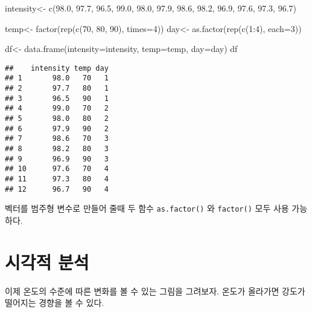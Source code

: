\documentclass[
]{book}
\newenvironment{Shaded}{\begin{snugshade}}{\end{snugshade}}
\newcommand{\AttributeTok}[1]{\textcolor[rgb]{0.77,0.63,0.00}{#1}}
\newcommand{\DecValTok}[1]{\textcolor[rgb]{0.00,0.00,0.81}{#1}}
\newcommand{\FloatTok}[1]{\textcolor[rgb]{0.00,0.00,0.81}{#1}}
\newcommand{\FunctionTok}[1]{\textcolor[rgb]{0.00,0.00,0.00}{#1}}
\newcommand{\NormalTok}[1]{#1}
\newcommand{\OtherTok}[1]{\textcolor[rgb]{0.56,0.35,0.01}{#1}}
\newcommand{\SpecialCharTok}[1]{\textcolor[rgb]{0.00,0.00,0.00}{#1}}
\begin{document}
\begin{Shaded}
\begin{Highlighting}[]
\NormalTok{intensity}\OtherTok{\textless{}{-}} \FunctionTok{c}\NormalTok{(}\FloatTok{98.0}\NormalTok{, }\FloatTok{97.7}\NormalTok{, }\FloatTok{96.5}\NormalTok{,}
              \FloatTok{99.0}\NormalTok{, }\FloatTok{98.0}\NormalTok{, }\FloatTok{97.9}\NormalTok{,}
              \FloatTok{98.6}\NormalTok{, }\FloatTok{98.2}\NormalTok{, }\FloatTok{96.9}\NormalTok{,}
              \FloatTok{97.6}\NormalTok{, }\FloatTok{97.3}\NormalTok{, }\FloatTok{96.7}\NormalTok{)}

\NormalTok{temp}\OtherTok{\textless{}{-}} \FunctionTok{factor}\NormalTok{(}\FunctionTok{rep}\NormalTok{(}\FunctionTok{c}\NormalTok{(}\DecValTok{70}\NormalTok{, }\DecValTok{80}\NormalTok{, }\DecValTok{90}\NormalTok{), }\AttributeTok{times=}\DecValTok{4}\NormalTok{))}
\NormalTok{day}\OtherTok{\textless{}{-}} \FunctionTok{as.factor}\NormalTok{(}\FunctionTok{rep}\NormalTok{(}\FunctionTok{c}\NormalTok{(}\DecValTok{1}\SpecialCharTok{:}\DecValTok{4}\NormalTok{), }\AttributeTok{each=}\DecValTok{3}\NormalTok{))}

\NormalTok{df}\OtherTok{\textless{}{-}} \FunctionTok{data.frame}\NormalTok{(}\AttributeTok{intensity=}\NormalTok{intensity, }\AttributeTok{temp=}\NormalTok{temp, }\AttributeTok{day=}\NormalTok{day)}
\NormalTok{df}
\end{Highlighting}
\end{Shaded}

\begin{verbatim}
##    intensity temp day
## 1       98.0   70   1
## 2       97.7   80   1
## 3       96.5   90   1
## 4       99.0   70   2
## 5       98.0   80   2
## 6       97.9   90   2
## 7       98.6   70   3
## 8       98.2   80   3
## 9       96.9   90   3
## 10      97.6   70   4
## 11      97.3   80   4
## 12      96.7   90   4
\end{verbatim}

벡터를 범주형 변수로 만들어 줄때 두 함수 \texttt{as.factor()} 와 \texttt{factor()} 모두 사용 가능하다.

\hypertarget{uxc2dcuxac01uxc801-uxbd84uxc11d}{%
\section{시각적 분석}\label{uxc2dcuxac01uxc801-uxbd84uxc11d}}

이제 온도의 수준에 따른 변화를 볼 수 있는 그림을 그려보자. 온도가 올라가면 강도가 떨어지는 경향을 볼 수 있다.
\end{document}
